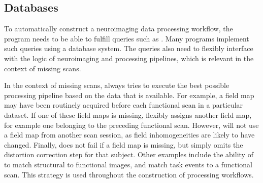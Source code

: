 \subsection{Databases}

To automatically construct a neuroimaging data processing workflow, the program needs to be able to fulfill queries such as . Many programs implement such queries using a database system. The queries also need to flexibly interface with the logic of neuroimaging and processing pipelines, which is relevant in the context of missing scans.

In the context of missing scans,  always tries to execute the best possible processing pipeline based on the data that is available. For example, a field map may have been routinely acquired before each functional scan in a particular dataset. If one of these field maps is missing,  flexibly assigns another field map, for example one belonging to the preceding functional scan. However,  will not use a field map from another scan session, as field inhomogeneities are likely to have changed. Finally,  does not fail if a field map is missing, but simply omits the distortion correction step for that subject. Other examples include the ability of  to match structural to functional images, and match task events to a functional scan. This strategy is used throughout the construction of processing workflows.
